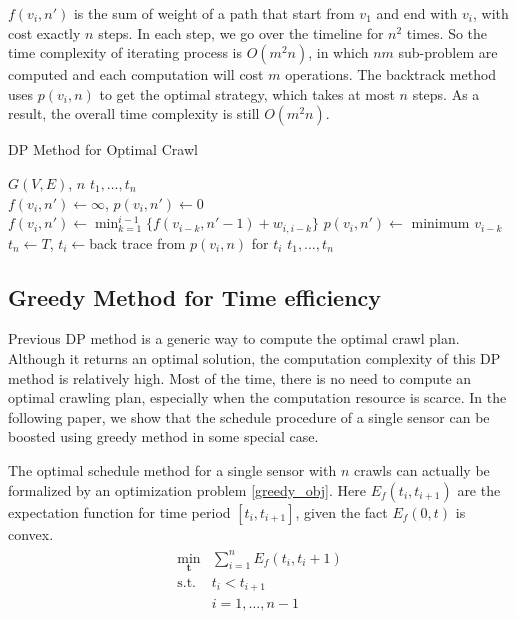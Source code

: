 \documentclass[conference]{IEEEtran}
\begin{document}
$f(v_i,n')$ is the sum of weight of a path that start from $v_1$ and end with $v_i$, with cost exactly $n$ steps. In each step, we go over the timeline for $n^2$ times.
So the time complexity of iterating process is $O(m^2n)$, in which $nm$ sub-problem are computed and each computation will cost $m$ operations. 
The backtrack method uses $p(v_i, n)$ to get the optimal strategy, which takes at most $n$ steps. 
As a result, the overall time complexity is still $O(m^2n)$.
\begin{algorithm}
\caption{DP Method for Optimal Crawl}
\label{alg:dp_min}
\begin{algorithmic}[1]
	\renewcommand{\algorithmicrequire}{\textbf{Input:}}
	\renewcommand{\algorithmicensure}{\textbf{Output:}}
	\REQUIRE $G(V,E)$, $n$
	\ENSURE  $t_1,\ldots,t_n$
	\\
	\STATE $f(v_i,n') \gets \infty$, $p(v_i,n')\gets 0$
	\STATE $f(v_i,n')\gets\min_{k=1}^{i-1}\{f(v_{i-k}, n'-1)+w_{i,i-k}\}$
	\STATE $p(v_i,n')\gets$ minimum $v_{i-k}$
	\ENDFOR
	\ENDFOR
	\STATE $t_n\gets T$, $t_i\gets$back trace from $p(v_i, n)$ for $t_i$
	\RETURN $t_1,\ldots,t_n$
\end{algorithmic}
\end{algorithm}

\subsection{Greedy Method for Time efficiency}

Previous DP method is a generic way to compute the optimal crawl plan. 
Although it returns an optimal solution, the computation complexity of this DP method is relatively high.
Most of the time, there is no need to compute an optimal crawling plan, especially when the computation resource is scarce.
In the following paper, we show that the schedule procedure of a single sensor can be boosted using greedy method in some special case.

The optimal schedule method for a single sensor with $n$ crawls can actually be formalized by an optimization problem \ref{greedy_obj}. 
Here $E_f(t_i,t_{i+1})$ are the expectation function for time period $[t_i, t_{i+1}]$, given the fact $E_f(0,t)$ is convex.
\begin{eqnarray}
\begin{array}{ll}
\min_{\textbf{t}}& \sum_{i=1}^{n} E_f(t_i,t_i+1)\\
\text{s.t.}
& t_i < t_{i+1}\\
& i=1,\ldots,n-1
\end{array}\label{greedy_obj}
\end{eqnarray}
\end{document}
